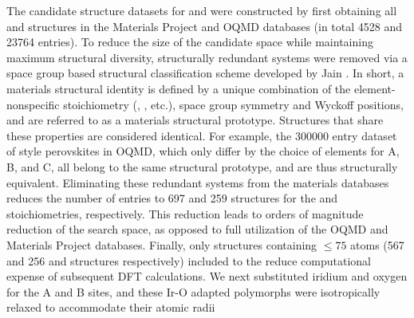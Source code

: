 %
%
%
The candidate structure datasets for \IrOtwo and \IrOthree were constructed by first obtaining all \ABtwo and \ABthree structures in the Materials Project\cite{Jain2013} and OQMD\cite{Kirklin2015} databases
(in total \num{4528} \ABtwo and \num{23764} \ABthree entries).
%
To reduce the size of the candidate space while maintaining maximum structural diversity, structurally redundant systems were removed via a space group based structural classification scheme developed by Jain  \cite{Jain2018}.
%
In short, a materials structural identity is defined by a unique combination of the element-nonspecific stoichiometry (\ABtwo, \ABthree, etc.), space group symmetry and Wyckoff positions, and are referred to as a materials structural prototype.
%
Structures that share these properties are considered identical.
%
For example, the \num{300000} entry dataset of \ABOthree style perovskites in OQMD, which only differ by the choice of elements for A, B, and C, all belong to the same structural prototype, and are thus structurally equivalent.
%
Eliminating these redundant systems from the materials databases reduces the number of entries to \num{697} and \num{259} structures for the \ABtwo and \ABthree stoichiometries, respectively.
%
This reduction leads to orders of magnitude reduction of the search space, as opposed to full utilization of the OQMD and Materials Project databases.
%
Finally, only structures containing $\leq\num{75}$ atoms
(\num{567} and \num{256} \ABtwo and \ABthree structures respectively)
included to the reduce computational expense of subsequent DFT calculations.
%
We next substituted iridium and oxygen for the A and B sites, and these Ir-O adapted polymorphs were isotropically relaxed to accommodate their atomic radii
